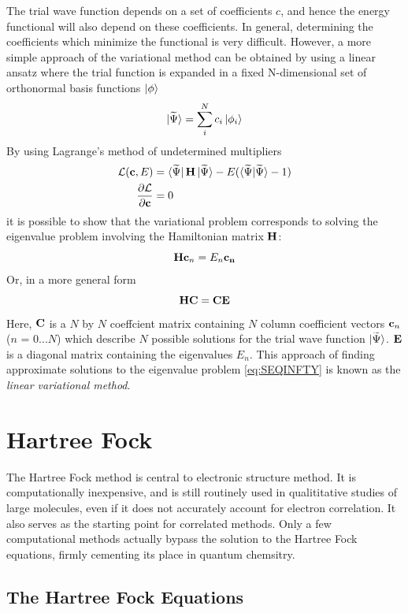 The trial wave function depends on a set of coefficients $c$, and hence the energy functional will also depend on these coefficients. In general, determining the coefficients which minimize the functional is very difficult. However, a more simple approach of the variational method can be obtained by using a linear ansatz where the trial function is expanded in a fixed N-dimensional set of orthonormal basis functions $\ket{\phi}$
\begin{equation}
\ket{\smash{\widetilde{\Psi}}} = \sum^N_i c_i \ket{\phi_i}
\end{equation}
By using Lagrange's method of undetermined multipliers
\begin{align}
\mathcal{L}(\mathbf{c},E) &= \bra{\smash{\widetilde{\Psi}}}\mathbf{H}\ket{\smash{\widetilde{\Psi}}} - E(\bra{\smash{\widetilde{\Psi}}}\ket{\smash{\widetilde{\Psi}}} - 1) \\
\frac{\partial \mathcal{L}}{\partial \mathcal{\mathbf{c}}} &= 0
\end{align}
\noindent it is possible to show that the variational problem corresponds to solving the eigenvalue problem involving the Hamiltonian matrix $\mathbf{H}$:
\begin{equation}
\mathbf{H}\mathbf{c}_n = E_n \mathbf{c_n}
\end{equation}
\noindent Or, in a more general form
\begin{equation}
\mathbf{H}\mathbf{C} = \mathbf{C}\mathbf{E}
\end{equation}
\noindent Here, $\mathbf{C}$ is a $N$ by $N$ coeffcient matrix containing $N$ column coefficient vectors $\mathbf{c}_n$ ($n$ = $0...N$) which describe $N$ possible solutions for the trial wave function $\ket{\smash{\widetilde{\Psi}}}$. $\mathbf{E}$ is a diagonal matrix containing the eigenvalues $E_n$. This approach of finding approximate solutions to the eigenvalue problem \ref{eq:SEQINFTY} is known as the \emph{linear variational method}. 

\section{Hartree Fock}

The Hartree Fock method is central to electronic structure method. It is computationally inexpensive, and is still routinely used in qualititative studies of large molecules, even if it does not accurately account for electron correlation. It also serves as the starting point for correlated methods. Only a few computational methods actually bypass the solution to the Hartree Fock equations, firmly cementing its place in quantum chemsitry.

\subsection{The Hartree Fock Equations}


